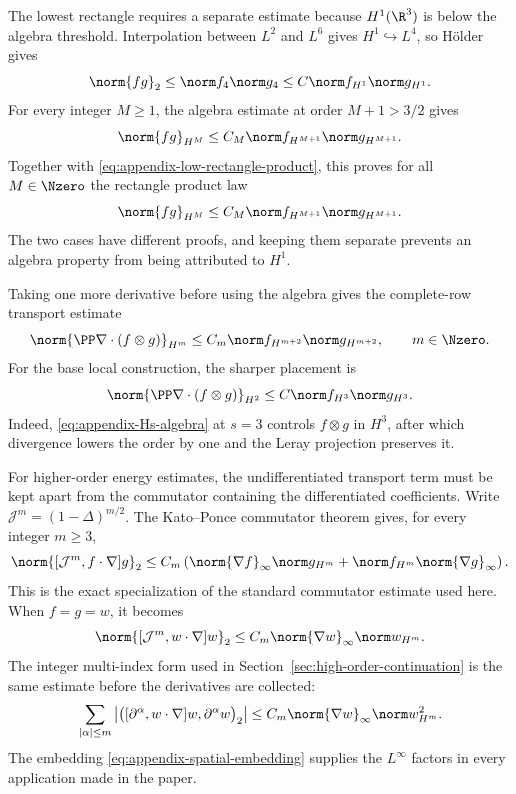 The lowest rectangle requires a separate estimate because \(H^1(\R^3)\) is below the algebra threshold.
Interpolation between \(L^2\) and \(L^6\) gives \(H^1\hookrightarrow L^4\), so Hölder gives
\begin{equation}
 \norm{fg}_2\le\norm f_4\norm g_4\le C\norm f_{H^1}\norm g_{H^1}.
 \label{eq:appendix-low-rectangle-product}
\end{equation}
For every integer \(M\ge1\), the algebra estimate at order \(M+1>3/2\) gives
\[
 \norm{fg}_{H^M}\le C_M\norm f_{H^{M+1}}\norm g_{H^{M+1}}.
\]
Together with \eqref{eq:appendix-low-rectangle-product}, this proves for all \(M\in\Nzero\) the rectangle product law
\begin{equation*}
 \norm{fg}_{H^M}\le C_M\norm f_{H^{M+1}}\norm g_{H^{M+1}}.
\end{equation*}
The two cases have different proofs, and keeping them separate prevents an algebra property from being attributed to \(H^1\).

Taking one more derivative before using the algebra gives the complete-row transport estimate
\[
 \norm{\PP\nabla\cdot(f\otimes g)}_{H^m}
 \le C_m\norm f_{H^{m+2}}\norm g_{H^{m+2}},
 \qquad
 m\in\Nzero.
\]
For the base local construction, the sharper placement is
\begin{equation}
 \norm{\PP\nabla\cdot(f\otimes g)}_{H^2}
 \le C\norm f_{H^3}\norm g_{H^3}.
 \label{eq:appendix-local-product}
\end{equation}
Indeed, \eqref{eq:appendix-Hs-algebra} at \(s=3\) controls \(f\otimes g\) in \(H^3\), after which divergence lowers the order by one and the Leray projection preserves it.

For higher-order energy estimates, the undifferentiated transport term must be kept apart from the commutator containing the differentiated coefficients.
Write \(\mathcal J^m=(1-\Delta)^{m/2}\).
The Kato--Ponce commutator theorem gives, for every integer \(m\ge3\),
\begin{equation}
 \norm{[\mathcal J^m,f\cdot\nabla]g}_2
 \le C_m\left(
 \norm{\nabla f}_\infty\norm g_{H^m}
 +\norm f_{H^m}\norm{\nabla g}_\infty
 \right).
 \label{eq:appendix-commutator}
\end{equation}
This is the exact specialization of the standard commutator estimate used here.
When \(f=g=w\), it becomes
\[
 \norm{[\mathcal J^m,w\cdot\nabla]w}_2
 \le C_m\norm{\nabla w}_\infty\norm w_{H^m}.
\]
The integer multi-index form used in Section~\ref{sec:high-order-continuation} is the same estimate before the derivatives are collected:
\[
 \sum_{|\alpha|\le m}
 \left|\bigl([\partial^\alpha,w\cdot\nabla]w,\partial^\alpha w\bigr)_2\right|
 \le C_m\norm{\nabla w}_\infty\norm w_{H^m}^2.
\]
The embedding \eqref{eq:appendix-spatial-embedding} supplies the \(L^\infty\) factors in every application made in the paper.

